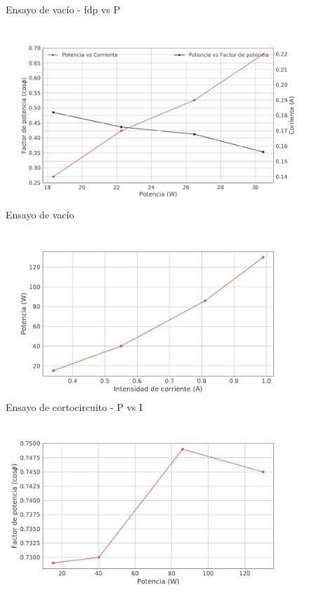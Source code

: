 \documentclass[a4paper,12pt]{article}
\begin{document}
\begin{enumerate}
\begin{figure}[H]
        \caption{Ensayo de vacío - fdp vs P}
    \end{figure}
    \begin{figure}[H]
        \centering
        \includegraphics[scale = 0.74]{vacio3.pdf}
        \caption{Ensayo de vacío}
    \end{figure}
    \begin{figure}[H]
        \centering
        \includegraphics[scale = 0.83]{corto1.pdf}
        \caption{Ensayo de cortocircuito - P vs I}
    \end{figure}
    \begin{figure}[H]
        \centering
        \includegraphics[scale = 0.83]{corto2.pdf}

\end{figure}
\end{enumerate}
\end{document}
